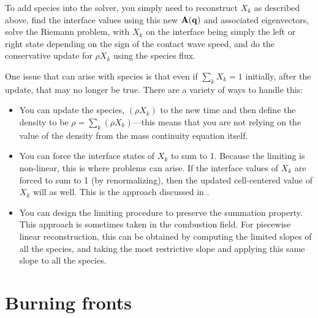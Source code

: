 To add species into the solver, you simply need to reconstruct $X_k$
as described above, find the interface values using this new ${\bf A}({\bf q})$
and associated eigenvectors, solve the Riemann problem, with $X_k$ on
the interface being simply the left or right state depending on the
sign of the contact wave speed, and do the conservative update for
$\rho X_k$ using the species flux.

One issue that can arise with species is that even if $\sum_k X_k = 1$
initially, after the update, that may no longer be true.  There are a
variety of ways to handle this:
\begin{itemize}
\item You can update the species, $(\rho X_k)$ to the new time and then
define the density to be $\rho = \sum_k (\rho X_k)$---this means that
you are not relying on the value of the density from the mass continuity
equation itself.

\item You can force the interface states of $X_k$ to sum to 1.  Because
the limiting is non-linear, this is where problems can arise.  If the
interface values of $X_k$ are forced to sum to 1 (by renormalizing), then
the updated cell-centered value of $X_k$ will as well.  This is the
approach discussed in \cite{plewamuller:1999}.

\item You can design the limiting procedure to preserve the summation
property.  This approach is sometimes taken in the combustion field.
For piecewise linear reconstruction, this can be obtained by computing
the limited slopes of all the species, and taking the most restrictive
slope and applying this same slope to all the species.
\end{itemize}


\section{Burning fronts}
